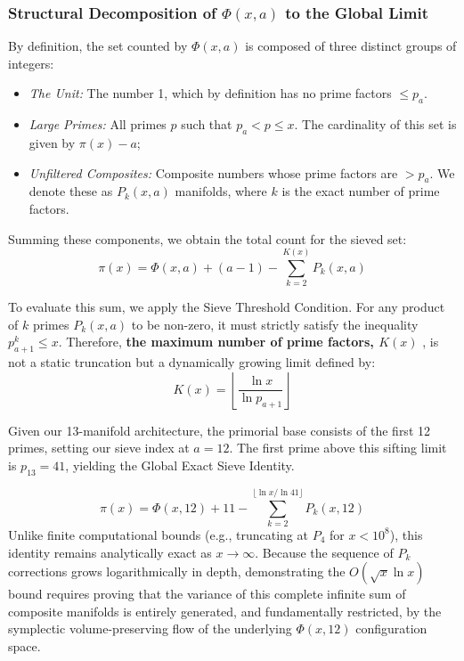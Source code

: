\documentclass[sn-mathphys-num, pdflatex]{sn-jnl}
\begin{document}
\subsubsection{Structural Decomposition of \texorpdfstring{$\Phi(x,a)$}{Phi(x,a)} to the Global Limit}
By definition, the set counted by $\Phi(x,a)$ is composed of three distinct groups of integers:
\begin{itemize}
    \item \textit{The Unit:} The number 1, which by definition has no prime  factors $\le p_a$.
    \item \textit{Large Primes:} All primes $p$ such that $p_a < p \le x$. The cardinality of this set is given by $\pi(x) - a$;
    \item \textit{Unfiltered Composites:} Composite numbers whose prime factors are $> p_a$. We denote these as $P_k(x,a)$ manifolds, where $k$ is the exact number of prime factors.
\end{itemize}

Summing these components, we obtain the total count for the sieved set:
\begin{equation}
\pi(x) = \Phi(x,a) + (a - 1) - \sum_{k=2}^{K(x)} P_k(x,a)
\end{equation}

To evaluate this sum, we apply the Sieve Threshold Condition. For any product of $k$ primes $P_k(x,a)$ to be non-zero, it must strictly satisfy the inequality $p_{a+1}^k \le x$. Therefore, \textbf{the maximum number of prime factors, $K(x)$} \label{Kx}, is not a static truncation but a dynamically growing limit defined by:
\begin{equation}
K(x) = \left\lfloor \frac{\ln x}{\ln p_{a+1}} \right\rfloor
\end{equation}

Given our 13-manifold architecture, the primorial base consists of the first 12 primes, setting our sieve index at $a=12$. The first prime above this sifting limit is $p_{13} = 41$, yielding the Global Exact Sieve Identity.

\begin{equation}
\label{eq:global_sieve}
\pi(x) = \Phi(x,12) + 11 - \sum_{k=2}^{\lfloor \ln x / \ln 41 \rfloor} P_k(x,12)
\end{equation}
Unlike finite computational bounds (e.g., truncating at $P_4$ for $x < 10^8$), this identity remains analytically exact as $x \rightarrow \infty$. Because the sequence of $P_k$ corrections grows logarithmically in depth, demonstrating the $O(\sqrt{x} \ln x)$ bound requires proving that the variance of this complete infinite sum of composite manifolds is entirely generated, and fundamentally restricted, by the symplectic volume-preserving flow of the underlying $\Phi(x,12)$ configuration space.
\end{document}
